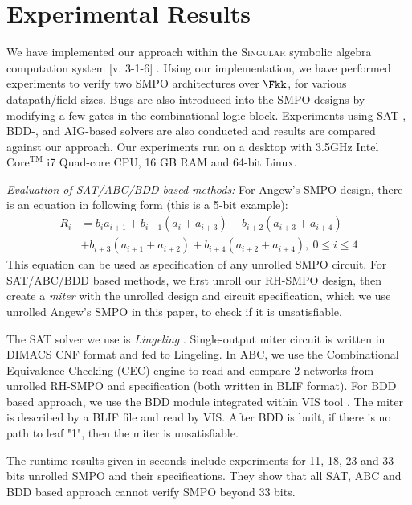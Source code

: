 \section{Experimental Results}
\label{sec:result}
We have implemented our approach within the \textsc{Singular} symbolic
algebra computation system [v. 3-1-6] \cite{DGPS}. Using our
implementation, we have performed experiments to verify two SMPO
architectures \cite{agnew1991implementation} \cite{RHmulti} over
$\Fkk$, for various datapath/field sizes. Bugs are also introduced
into the SMPO designs by modifying a few gates in the combinational
logic block. Experiments using SAT-, BDD-, and AIG-based solvers are
also conducted and results are compared against our approach. 
Our experiments run on a desktop with 3.5GHz Intel
$\text{Core}^\text{TM}$ i7 Quad-core CPU, 16 GB RAM and 64-bit Linux.  

{\it Evaluation of SAT/ABC/BDD based methods:} 
For Angew's SMPO
design, there is an equation in following form (this is a 5-bit
example): 
\begin{align}
R_i &= b_ia_{i+1} + b_{i+1}(a_i + a_{i+3}) + b_{i+2}(a_{i+3} + a_{i+4}) \nonumber\\
&+ b_{i+3}(a_{i+1} + a_{i+2}) + b_{i+4}
(a_{i+2} + a_{i+4}),\ 0\leq i\leq 4 \nonumber
\end{align}
This equation can be used as specification of any unrolled SMPO circuit. For SAT/ABC/BDD based methods,
we first unroll our RH-SMPO design, then create a \emph{miter} with the unrolled design and
circuit specification, which we use unrolled Angew's SMPO in this paper, to check if it is unsatisfiable.

The SAT solver we use is \emph{Lingeling} \cite{biere2013lingeling}. Single-output miter circuit is written
in DIMACS CNF \cite{DIMACSformat} format and fed to Lingeling. In ABC, we use the Combinational Equivalence Checking (CEC) engine 
 to read and compare 2 networks from unrolled RH-SMPO and specification (both written in BLIF format). 
 For BDD based approach, we use the BDD module integrated within VIS tool \cite{brayton1996vis}. The miter is described by a BLIF 
 file and read by VIS. After BDD is built, if there is no path to leaf "1", then the miter is unsatisfiable.

The runtime results given in seconds include experiments for 11, 18, 23 and 33 bits unrolled SMPO
and their specifications. They show that all SAT, ABC and BDD based approach 
cannot verify SMPO beyond 33 bits.

